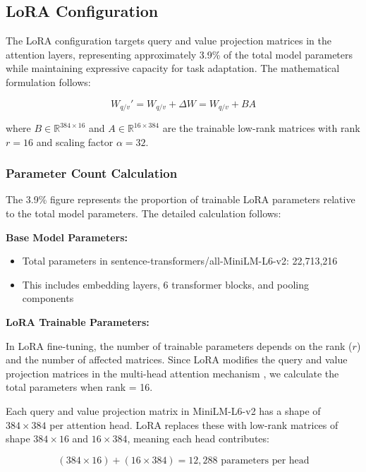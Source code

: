 \subsection{LoRA Configuration}

The LoRA configuration targets query and value projection matrices in the attention layers, representing approximately 3.9\% of the total model parameters while maintaining expressive capacity for task adaptation. The mathematical formulation follows:

\begin{equation}
W_{q/v}' = W_{q/v} + \Delta W = W_{q/v} + B A
\end{equation}

where $B \in \mathbb{R}^{384 \times 16}$ and $A \in \mathbb{R}^{16 \times 384}$ are the trainable low-rank matrices with rank $r=16$ and scaling factor $\alpha=32$.

\subsubsection{Parameter Count Calculation}

The 3.9\% figure represents the proportion of trainable LoRA parameters relative to the total model parameters. The detailed calculation follows:

\textbf{Base Model Parameters:}
\begin{itemize}
\item Total parameters in sentence-transformers/all-MiniLM-L6-v2: 22,713,216
\item This includes embedding layers, 6 transformer blocks, and pooling components
\end{itemize}

\textbf{LoRA Trainable Parameters:}

In LoRA fine-tuning, the number of trainable parameters depends on the rank ($r$) and the number of affected matrices. Since LoRA modifies the query and value projection matrices in the multi-head attention mechanism \cite{vaswani2017attention}, we calculate the total parameters when rank = 16.

Each query and value projection matrix in MiniLM-L6-v2 has a shape of $384 \times 384$ per attention head. LoRA replaces these with low-rank matrices of shape $384 \times 16$ and $16 \times 384$, meaning each head contributes:

\begin{equation}
(384 \times 16) + (16 \times 384) = 12,288 \text{ parameters per head}
\end{equation}

